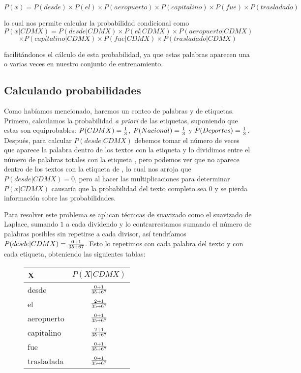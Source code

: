 \[ P(x) = P(desde) \times P(el) \times P(aeropuerto) \times P(capitalino) \times P(fue) \times P(trasladado) \]

lo cual nos permite calcular la probabilidad condicional como
\[ P(x | CDMX) = P(desde|CDMX) \times P(el|CDMX) \times P(aeropuerto|CDMX) \]
\[ \times P(capitalino|CDMX) \times P(fue|CDMX) \times P(trasladado|CDMX) \]

facilitándonos el cálculo de esta probabilidad, ya que estas palabras aparecen una o varias veces en nuestro conjunto de entrenamiento.

\subsection{Calculando probabilidades}

Como habíamos mencionado, haremos un conteo de palabras y de etiquetas. Primero, calculamos la probabilidad \textit{a priori} de las etiquetas, suponiendo que estas son equiprobables: \(P(CDMX) = {1 \over 3}\), \(P(Nacional) = {1 \over 3}\) y \(P(Deportes) = {1 \over 3}\). Después, para calcular \(P(desde|CDMX)\) debemos tomar el número de veces que aparece la palabra  dentro de los textos con la etiqueta  y lo dividimos entre el número de palabras totales con la etiqueta , pero podemos ver que  no aparece dentro de los textos con la etiqueta de , lo cual nos arroja que \(P(desde|CDMX) = 0\), pero al hacer las multiplicaciones para determinar \(P(x| CDMX)\) causaría que la probabilidad del texto completo sea $0$ y se pierda información sobre las probabilidades.

Para resolver este problema se aplican técnicas de suavizado \parencite[ver][202]{ManningSchutze1999} como el suavizado de Laplace, sumando $1$ a cada dividendo y lo contrarrestamos sumando el número de palabras posibles sin repetirse a cada divisor, así tendríamos \(P(desde|CDMX) = {{0 + 1} \over {35 + 67} }\). Esto lo repetimos con cada palabra del texto  y con cada etiqueta, obteniendo las siguientes tablas:

\begin{figure}[H]
  \begin{center}
    \begin{tabular}{ l | c }
      X & $P(X|CDMX)$ \\ \hline
      desde & $0 + 1 \over {35 + 67}$ \\ \hline
      el & $2 + 1 \over {35 + 67}$ \\ \hline
      aeropuerto & $0 + 1 \over {35 + 67}$ \\ \hline
      capitalino & $2 + 1 \over {35 + 67}$ \\ \hline
      fue & $0 + 1 \over {35 + 67}$ \\ \hline
      trasladada & $0 + 1 \over {35 + 67}$ \\
    \end{tabular}
  \end{center}
\end{figure}

